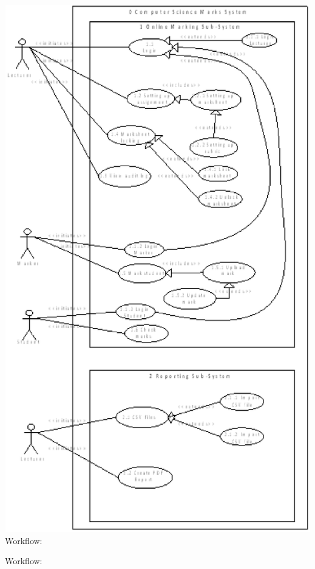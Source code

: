 \documentclass{article}
\begin{document}
\includegraphics*[width=5.37in, height=9.02in, keepaspectratio=false]{image24}Workflow:











































Workflow:



\noindent 

\noindent 
\end{document}
